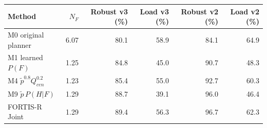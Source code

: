 \begin{tabular}{lrrrrr}
\toprule
Method & $N_F$ & Robust v3 (\%) & Load v3 (\%) & Robust v2 (\%) & Load v2 (\%) \\
\midrule
M0 original planner & 6.07 & 80.1 & 58.9 & 84.1 & 64.9 \\
M1 learned $P(F)$ & 1.25 & 84.8 & 45.0 & 90.7 & 48.3 \\
M4 $\tilde p^{0.8} Q_{cen}^{0.2}$ & 1.23 & 85.4 & 55.0 & 92.7 & 60.3 \\
M9 $\tilde p\,P(H|F)$ & 1.29 & 88.7 & 39.1 & 96.0 & 46.4 \\
FORTIS-R Joint & 1.29 & 89.4 & 56.3 & 96.7 & 62.3 \\
\bottomrule
\end{tabular}
